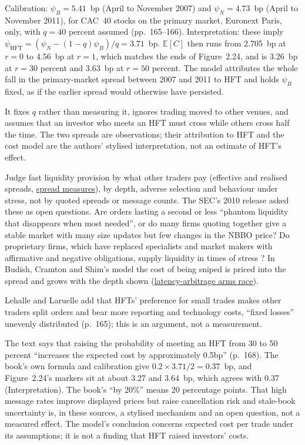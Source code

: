 \begin{qfresult}
 Calibration: $\psi_B=5.41$~bp (April to November 2007) and $\psi_N=4.73$~bp (April to November 2011), for CAC~40 stocks on the primary market, Euronext Paris, only, with $q=40$ percent assumed (pp.~165--166). Interpretation: these imply $\psi_{\mathrm{HFT}}=(\psi_N-(1-q)\psi_B)/q=3.71$~bp. $\mathbb E[C]$ then runs from 2.705~bp at $r=0$ to 4.56~bp at $r=1$, which matches the ends of Figure~2.24, and is 3.26~bp at $r=30$ percent and 3.63~bp at $r=50$ percent. The model attributes the whole fall in the primary-market spread between 2007 and 2011 to HFT and holds $\psi_B$ fixed, as if the earlier spread would otherwise have persisted.

It fixes $q$ rather than measuring it, ignores trading moved to other venues, and assumes that an investor who meets an HFT must cross while others cross half the time. The two spreads are observations; their attribution to HFT and the cost model are the authors' stylised interpretation, not an estimate of HFT's effect.

 Judge fast liquidity provision by what other traders pay (effective and realised spreads, \hyperref[def:spread-measures]{spread measures}), by depth, adverse selection and behaviour under stress, not by quoted spreads or message counts. The SEC's 2010 release asked these as open questions. Are orders lasting a second or less ``phantom liquidity that disappears when most needed'', or do many firms quoting together give a stable market with many size updates but few changes in the NBBO price? Do proprietary firms, which have replaced specialists and market makers with affirmative and negative obligations, supply liquidity in times of stress \citep[sec.~IV.B.1, pp.~48--51]{sec-concept-release-2010}? In Budish, Cramton and Shim's model the cost of being sniped is priced into the spread and grows with the depth shown (\hyperref[res:latency-arbitrage-arms-race]{latency-arbitrage arms race}).

Lehalle and Laruelle add that HFTs' preference for small trades makes other traders split orders and bear more reporting and technology costs, ``fixed losses'' unevenly distributed (p.~165); this is an argument, not a measurement.

 The text says that raising the probability of meeting an HFT from 30 to 50 percent ``increases the expected cost by approximately 0.5bp'' (p.~168). The book's own formula and calibration give $0.2\times3.71/2=0.37$~bp, and Figure~2.24's markers sit at about 3.27 and 3.64~bp, which agrees with 0.37 (Interpretation). The book's ``by 20\%'' means 20 percentage points. That high message rates improve displayed prices but raise cancellation risk and stale-book uncertainty is, in these sources, a stylised mechanism and an open question, not a measured effect. The model's conclusion concerns expected cost per trade under its assumptions; it is not a finding that HFT raised investors' costs.


\end{qfresult}
